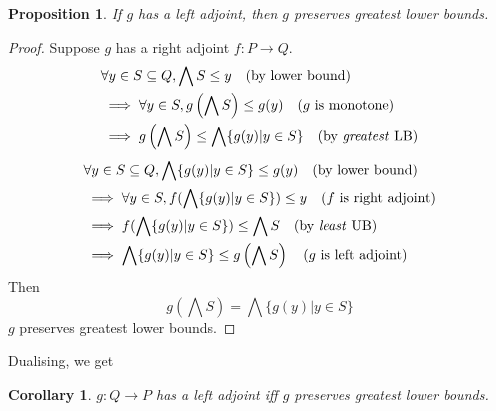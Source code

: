 \documentclass[11pt]{article} %
\newtheorem{corollary}[theorem]{Corollary}
\newtheorem{proposition}[theorem]{Proposition}
\theoremstyle{definition}
\theoremstyle{definition}
\theoremstyle{definition}
\begin{document}
\begin{proposition}
  If $g$ has a left adjoint, then $g$ preserves greatest lower bounds.
\end{proposition}
\begin{proof}
Suppose $g$ has a right adjoint $f: P\rightarrow Q$.
\begin{equation}
\begin{aligned}
  &\forall y\in S\subseteq Q, \bigwedge S \leq y \quad\text{(by lower bound)}\\
  &\implies \forall y\in S, g\left(\bigwedge S\right) \leq g(y) \quad\text{($g$ is monotone)}\\
  &\implies g\left(\bigwedge S\right) \leq \bigwedge \{g(y) | y\in S\} \quad\text{(by \textit{greatest} LB)}
\end{aligned}
\end{equation}
\begin{equation}
\begin{aligned}
  &\forall y\in S\subseteq Q, \bigwedge\{g(y) | y\in S\} \leq g(y) \quad\text{(by lower bound)}\\
  &\implies \forall y\in S, f(\bigwedge\{g(y) | y\in S\}) \leq y \quad\text{($f$ is right adjoint)}\\
  &\implies f(\bigwedge\{g(y) | y\in S\}) \leq \bigwedge S \quad\text{(by \textit{least} UB)}\\
  &\implies \bigwedge\{g(y) | y\in S\} \leq g\left(\bigwedge S\right) \quad\text{($g$ is left adjoint)}
\end{aligned}
\end{equation}
Then
\[g\left(\bigwedge S\right) = \bigwedge \{g(y) | y\in S\}\]
$g$ preserves greatest lower bounds.
\end{proof}
Dualising, we get
\begin{corollary}
  $g:Q\rightarrow P$ has a left adjoint iff $g$ preserves greatest lower bounds.
\end{corollary}
\end{document}
